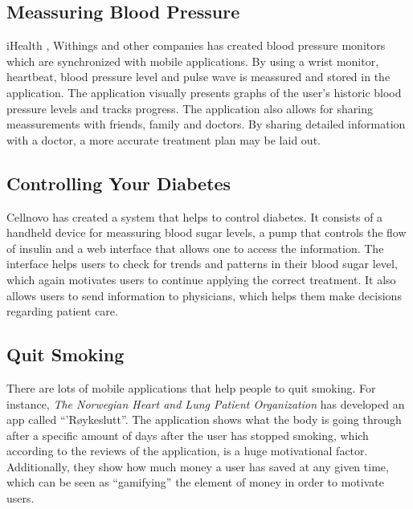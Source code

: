 \subsection{Meassuring Blood Pressure}
\label{sec:bloodpressure}
iHealth , Withings and other companies has created blood pressure monitors which are synchronized with mobile applications. By using a wrist monitor, heartbeat, blood pressure level and pulse wave is meassured and stored in the application. The application visually presents graphs of the user's historic blood pressure levels and tracks progress. The application also allows for sharing meassurements with friends, family and doctors. By sharing detailed information with a doctor, a more accurate treatment plan may be laid out.


\subsection{Controlling Your Diabetes}
\label{sec:controldiabetes}
Cellnovo has created a system that helps to control diabetes. It consists of a handheld device for meassuring blood sugar levels, a pump that controls the flow of insulin and a web interface that allows one to access the information. The interface helps users to check for trends and patterns in their blood sugar level, which again motivates users to continue applying the correct treatment. It also allows users to send information to physicians, which helps them make decisions regarding patient care.
      


\subsection{Quit Smoking}
\label{sec:quitsmoking}
There are lots of mobile applications that help people to quit smoking. For instance, \emph{The Norwegian Heart and Lung Patient Organization} has developed an app called ``'R\o ykeslutt''. The application shows what the body is going through after a specific amount of days after the user has stopped smoking, which according to the reviews of the application, is a huge motivational factor. Additionally, they show how much money a user has saved at any given time, which can be seen as ``gamifying'' the element of money in order to motivate users.  


